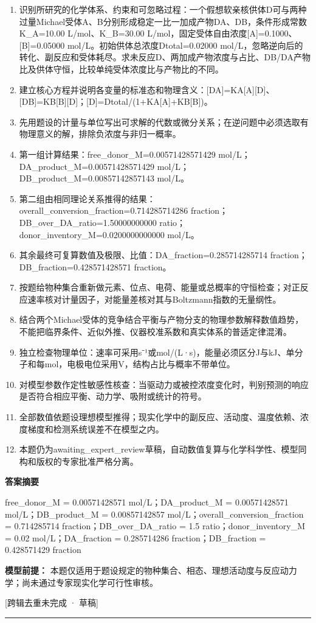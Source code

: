 \documentclass[UTF8,11pt,a4paper]{ctexart}
\begin{document}
\begin{enumerate}
\item 识别所研究的化学体系、约束和可忽略过程：一个假想软亲核供体D可与两种过量Michael受体A、B分别形成稳定一比一加成产物DA、DB，条件形成常数K\_A=10.00 L/mol、K\_B=30.00 L/mol，固定受体自由浓度[A]=0.1000、[B]=0.05000 mol/L。初始供体总浓度Dtotal=0.02000 mol/L，忽略逆向后的转化、副反应和受体耗尽。求未反应D、两加成产物浓度与占比、DB/DA产物比及供体守恒，比较单纯受体浓度比与产物比的不同。
\item 建立核心方程并说明各变量的标准态和物理含义：[DA]=KA[A][D]、[DB]=KB[B][D]；[D]=Dtotal/(1+KA[A]+KB[B])。
\item 先用题设的计量与单位写出可求解的代数或微分关系；在逆问题中必须选取有物理意义的解，排除负浓度与非归一概率。
\item 第一组计算结果：free\_donor\_M=0.00571428571429 mol/L；DA\_product\_M=0.00571428571429 mol/L；DB\_product\_M=0.00857142857143 mol/L。
\item 第二组由相同理论关系推得的结果：overall\_conversion\_fraction=0.714285714286 fraction；DB\_over\_DA\_ratio=1.50000000000 ratio；donor\_inventory\_M=0.0200000000000 mol/L。
\item 其余最终可复算数值及极限、比值：DA\_fraction=0.285714285714 fraction；DB\_fraction=0.428571428571 fraction。
\item 按题给物种集合重新做元素、位点、电荷、能量或总概率的守恒检查；对正反应速率核对计量因子，对能量差核对其与Boltzmann指数的无量纲性。
\item 结合两个Michael受体的竞争结合平衡与产物分支的物理参数解释数值趋势，不能把临界条件、近似外推、仪器校准系数和真实体系的普适定律混淆。
\item 独立检查物理单位：速率可采用s⁻¹或mol/(L·s)，能量必须区分J与kJ、单分子和每mol，电极电位采用V，结构占比与概率不带单位。
\item 对模型参数作定性敏感性核查：当驱动力或被控浓度变化时，判别预测的响应是否符合相应平衡、动力学、吸附或统计的符号。
\item 全部数值依题设理想模型推得；现实化学中的副反应、活动度、温度依赖、浓度梯度和检测系统误差不在模型之内。
\item 本题仍为awaiting\_expert\_review草稿，自动数值复算与化学科学性、模型同构和版权的专家批准严格分离。
\end{enumerate}
\noindent\textbf{答案摘要}\par
free\_donor\_M = 0.00571428571 mol/L；DA\_product\_M = 0.00571428571 mol/L；DB\_product\_M = 0.00857142857 mol/L；overall\_conversion\_fraction = 0.714285714 fraction；DB\_over\_DA\_ratio = 1.5 ratio；donor\_inventory\_M = 0.02 mol/L；DA\_fraction = 0.285714286 fraction；DB\_fraction = 0.428571429 fraction\par
\noindent\textbf{模型前提：}
本题仅适用于题设规定的物种集合、相态、理想活动度与反应动力学；尚未通过专家现实化学可行性审核。\par
\noindent\textcolor{red!65!black}{[跨辑去重未完成 · 草稿]} \par
\medskip\hrule\medskip
{}
\end{document}
